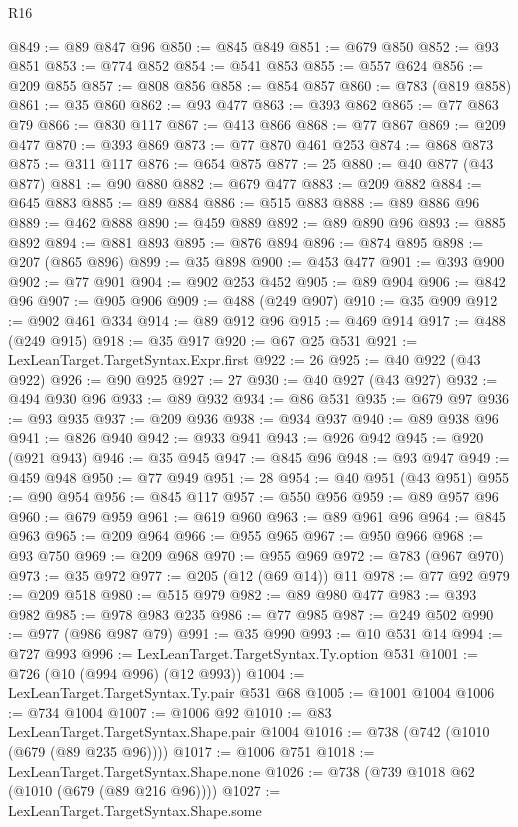\begin{lexlean}{R16}
\begin{coremodule}
@849 := @89 @847 @96
@850 := @845 @849
@851 := @679 @850
@852 := @93 @851
@853 := @774 @852
@854 := @541 @853
@855 := @557 @624
@856 := @209 @855
@857 := @808 @856
@858 := @854 @857
@860 := @783 (@819 @858)
@861 := @35 @860
@862 := @93 @477
@863 := @393 @862
@865 := @77 @863 @79
@866 := @830 @117
@867 := @413 @866
@868 := @77 @867
@869 := @209 @477
@870 := @393 @869
@873 := @77 @870 @461 @253
@874 := @868 @873
@875 := @311 @117
@876 := @654 @875
@877 := 25
@880 := @40 @877 (@43 @877)
@881 := @90 @880
@882 := @679 @477
@883 := @209 @882
@884 := @645 @883
@885 := @89 @884
@886 := @515 @883
@888 := @89 @886 @96
@889 := @462 @888
@890 := @459 @889
@892 := @89 @890 @96
@893 := @885 @892
@894 := @881 @893
@895 := @876 @894
@896 := @874 @895
@898 := @207 (@865 @896)
@899 := @35 @898
@900 := @453 @477
@901 := @393 @900
@902 := @77 @901
@904 := @902 @253 @452
@905 := @89 @904
@906 := @842 @96
@907 := @905 @906
@909 := @488 (@249 @907)
@910 := @35 @909
@912 := @902 @461 @334
@914 := @89 @912 @96
@915 := @469 @914
@917 := @488 (@249 @915)
@918 := @35 @917
@920 := @67 @25 @531
@921 := LexLeanTarget.TargetSyntax.Expr.first
@922 := 26
@925 := @40 @922 (@43 @922)
@926 := @90 @925
@927 := 27
@930 := @40 @927 (@43 @927)
@932 := @494 @930 @96
@933 := @89 @932
@934 := @86 @531
@935 := @679 @97
@936 := @93 @935
@937 := @209 @936
@938 := @934 @937
@940 := @89 @938 @96
@941 := @826 @940
@942 := @933 @941
@943 := @926 @942
@945 := @920 (@921 @943)
@946 := @35 @945
@947 := @845 @96
@948 := @93 @947
@949 := @459 @948
@950 := @77 @949
@951 := 28
@954 := @40 @951 (@43 @951)
@955 := @90 @954
@956 := @845 @117
@957 := @550 @956
@959 := @89 @957 @96
@960 := @679 @959
@961 := @619 @960
@963 := @89 @961 @96
@964 := @845 @963
@965 := @209 @964
@966 := @955 @965
@967 := @950 @966
@968 := @93 @750
@969 := @209 @968
@970 := @955 @969
@972 := @783 (@967 @970)
@973 := @35 @972
@977 := @205 (@12 (@69 @14)) @11
@978 := @77 @92
@979 := @209 @518
@980 := @515 @979
@982 := @89 @980 @477
@983 := @393 @982
@985 := @978 @983 @235
@986 := @77 @985
@987 := @249 @502
@990 := @977 (@986 @987 @79)
@991 := @35 @990
@993 := @10 @531 @14
@994 := @727 @993
@996 := LexLeanTarget.TargetSyntax.Ty.option @531
@1001 := @726 (@10 (@994 @996) (@12 @993))
@1004 := LexLeanTarget.TargetSyntax.Ty.pair @531 @68
@1005 := @1001 @1004
@1006 := @734 @1004
@1007 := @1006 @92
@1010 := @83 LexLeanTarget.TargetSyntax.Shape.pair @1004
@1016 := @738 (@742 (@1010 (@679 (@89 @235 @96))))
@1017 := @1006 @751
@1018 := LexLeanTarget.TargetSyntax.Shape.none
@1026 := @738 (@739 @1018 @62 (@1010 (@679 (@89 @216 @96))))
@1027 := LexLeanTarget.TargetSyntax.Shape.some

\end{coremodule}
\end{lexlean}
